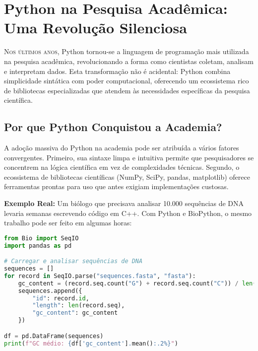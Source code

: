 
\chapter{Python na Pesquisa Acadêmica: Uma Revolução Silenciosa}

\lettrine{N}{os últimos anos}, Python tornou-se a linguagem de programação mais utilizada na pesquisa acadêmica, revolucionando a forma como cientistas coletam, analisam e interpretam dados. Esta transformação não é acidental: Python combina simplicidade sintática com poder computacional, oferecendo um ecossistema rico de bibliotecas especializadas que atendem às necessidades específicas da pesquisa científica.

\section{Por que Python Conquistou a Academia?}

A adoção massiva do Python na academia pode ser atribuída a vários fatores convergentes. Primeiro, sua sintaxe limpa e intuitiva permite que pesquisadores se concentrem na lógica científica em vez de complexidades técnicas. Segundo, o ecossistema de bibliotecas científicas (NumPy, SciPy, pandas, matplotlib) oferece ferramentas prontas para uso que antes exigiam implementações custosas.

\begin{examplebox}
\textbf{Exemplo Real:} Um biólogo que precisava analisar 10.000 sequências de DNA levaria semanas escrevendo código em C++. Com Python e BioPython, o mesmo trabalho pode ser feito em algumas horas:

\begin{lstlisting}[language=Python]
from Bio import SeqIO
import pandas as pd

# Carregar e analisar sequências de DNA
sequences = []
for record in SeqIO.parse("sequences.fasta", "fasta"):
    gc_content = (record.seq.count("G") + record.seq.count("C")) / len(record.seq)
    sequences.append({
        "id": record.id,
        "length": len(record.seq),
        "gc_content": gc_content
    })

df = pd.DataFrame(sequences)
print(f"GC médio: {df['gc_content'].mean():.2%}")
\end{lstlisting}
\end{examplebox}

